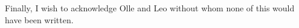 Finally, I wish to acknowledge Olle and Leo without whom none of this would have been written.



% 

